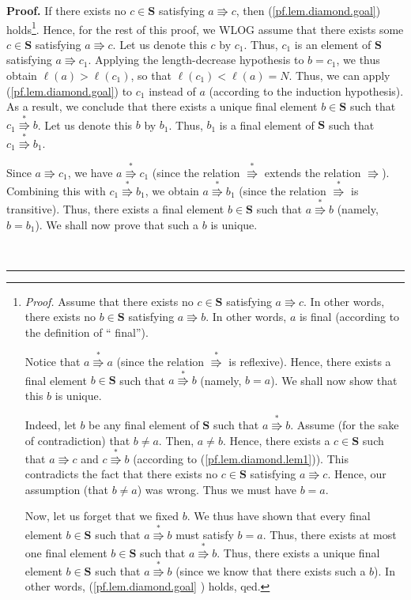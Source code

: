 \documentclass[numbers=enddot,12pt,final,onecolumn,notitlepage]{scrartcl}%
\theoremstyle{definition}
\newenvironment{proof}[1][Proof]{\noindent\textbf{#1.} }{\ \rule{0.5em}{0.5em}}
\newenvironment{verlong}{}{}
\begin{document}
\begin{verlong}
\begin{proof}
If there exists no $c\in\mathbf{S}$ satisfying $a\Rrightarrow c$, then
(\ref{pf.lem.diamond.goal}) holds\footnote{\textit{Proof.} Assume that there
exists no $c\in\mathbf{S}$ satisfying $a\Rrightarrow c$. In other words, there
exists no $b\in\mathbf{S}$ satisfying $a\Rrightarrow b$. In other words, $a$
is final (according to the definition of \textquotedblleft
final\textquotedblright).
\par
Notice that $a\overset{\ast}{\Rrightarrow}a$ (since the relation
$\overset{\ast}{\Rrightarrow}$ is reflexive). Hence, there exists a final
element $b\in\mathbf{S}$ such that $a\overset{\ast}{\Rrightarrow}b$ (namely,
$b=a$). We shall now show that this $b$ is unique.
\par
Indeed, let $b$ be any final element of $\mathbf{S}$ such that $a\overset{\ast
}{\Rrightarrow}b$. Assume (for the sake of contradiction) that $b\neq a$.
Then, $a\neq b$. Hence, there exists a $c\in\mathbf{S}$ such that
$a\Rrightarrow c$ and $c\overset{\ast}{\Rrightarrow}b$ (according to
(\ref{pf.lem.diamond.lem1})). This contradicts the fact that there exists no
$c\in\mathbf{S}$ satisfying $a\Rrightarrow c$. Hence, our assumption (that
$b\neq a$) was wrong. Thus we must have $b=a$.
\par
Now, let us forget that we fixed $b$. We thus have shown that every final
element $b\in\mathbf{S}$ such that $a\overset{\ast}{\Rrightarrow}b$ must
satisfy $b=a$. Thus, there exists at most one final element $b\in\mathbf{S}$
such that $a\overset{\ast}{\Rrightarrow}b$. Thus, there exists a unique final
element $b\in\mathbf{S}$ such that $a\overset{\ast}{\Rrightarrow}b$ (since we
know that there exists such a $b$). In other words, (\ref{pf.lem.diamond.goal}%
) holds, qed.}. Hence, for the rest of this proof, we WLOG assume that there
exists some $c\in\mathbf{S}$ satisfying $a\Rrightarrow c$. Let us denote this
$c$ by $c_{1}$. Thus, $c_{1}$ is an element of $\mathbf{S}$ satisfying
$a\Rrightarrow c_{1}$. Applying the length-decrease hypothesis to $b=c_{1}$,
we thus obtain $\ell\left(  a\right)  >\ell\left(  c_{1}\right)  $, so that
$\ell\left(  c_{1}\right)  <\ell\left(  a\right)  =N$. Thus, we can apply
(\ref{pf.lem.diamond.goal}) to $c_{1}$ instead of $a$ (according to the
induction hypothesis). As a result, we conclude that there exists a unique
final element $b\in\mathbf{S}$ such that $c_{1}\overset{\ast}{\Rrightarrow}b$.
Let us denote this $b$ by $b_{1}$. Thus, $b_{1}$ is a final element of
$\mathbf{S}$ such that $c_{1}\overset{\ast}{\Rrightarrow}b_{1}$.

Since $a\Rrightarrow c_{1}$, we have $a\overset{\ast}{\Rrightarrow}c_{1}$
(since the relation $\overset{\ast}{\Rrightarrow}$ extends the relation
$\Rrightarrow$). Combining this with $c_{1}\overset{\ast}{\Rrightarrow}b_{1}$,
we obtain $a\overset{\ast}{\Rrightarrow}b_{1}$ (since the relation
$\overset{\ast}{\Rrightarrow}$ is transitive). Thus, there exists a final
element $b\in\mathbf{S}$ such that $a\overset{\ast}{\Rrightarrow}b$ (namely,
$b=b_{1}$). We shall now prove that such a $b$ is unique.


\end{proof}
\end{verlong}
\end{document}
